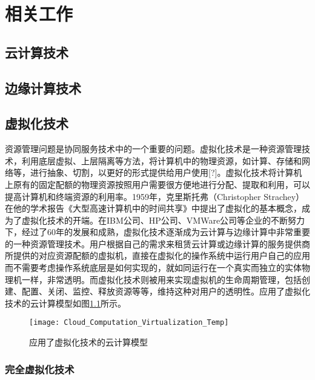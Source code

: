 \chapter{相关工作 }\label{chap:related_work}
\section{云计算技术}
\section{边缘计算技术}


\section{虚拟化技术}
资源管理问题是协同服务技术中的一个重要的问题\citep{文雨2013面向应用服务级目标的虚拟化资源管理}。虚拟化技术是一种资源管理技术，利用底层虚拟、上层隔离等方法，将计算机中的物理资源，如计算、存储和网络等，进行抽象、切割，以更好的形式提供给用户使用[?]。虚拟化技术将计算机上原有的固定配额的物理资源按照用户需要很方便地进行分配、提取和利用，可以提高计算机和终端资源的利用率。1959年，克里斯托弗（Christopher Strachey）在他的学术报告《大型高速计算机中的时间共享》中提出了虚拟化的基本概念，成为了虚拟化技术的开端\citep{本刊编辑部2017虚拟化概述}。在IBM公司、HP公司、VMWare公司等企业的不断努力下，经过了60年的发展和成熟，虚拟化技术逐渐成为云计算与边缘计算中非常重要的一种资源管理技术\citep{pearce2013virtualization}。用户根据自己的需求来租赁云计算或边缘计算的服务提供商所提供的对应资源配额的虚拟机，直接在虚拟化的操作系统中运行用户自己的应用而不需要考虑操作系统底层是如何实现的，就如同运行在一个真实而独立的实体物理机一样，非常透明。而虚拟化技术则被用来实现虚拟机的生命周期管理，包括创建、配置、关闭、监控、释放资源等等，维持这种对用户的透明性。应用了虚拟化技术的云计算模型如图\ref{fig:cloud_computation_virtualization}所示\citep{陈思锦2015云计算中的虚拟化技术与虚拟化安全}。
\begin{figure}[!htbp]
    \centering
    \texttt{[image: Cloud\_Computation\_Virtualization\_Temp]}
    \caption{应用了虚拟化技术的云计算模型}
    \label{fig:cloud_computation_virtualization}
\end{figure}

\subsection{完全虚拟化技术}

